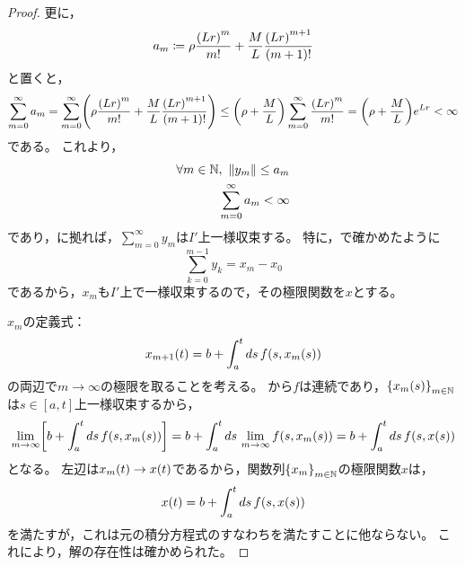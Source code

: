 \documentclass[b5paper,draft,oneside,openany]{ltjsbook} %
\begin{document}
\begin{thm}[Picardの定理]
\begin{proof}
        更に，
        \begin{equation}
            a_m\coloneqq \rho \frac{\pare{Lr}^m}{m!}+\frac{M}{L}\frac{\pare{Lr}^{m+1}}{\pare{m+1}!}
        \end{equation}
        と置くと，
        \begin{equation}
            \sum_{m=0}^\infty a_m
            =\sum_{m=0}^\infty\pare{\rho \frac{\pare{Lr}^m}{m!}+\frac{M}{L}\frac{\pare{Lr}^{m+1}}{\pare{m+1}!}}
            \leq \pare{\rho+\frac{M}{L}}\sum_{m=0}^\infty\frac{\pare{Lr}^m}{m!}
            =\pare{\rho+\frac{M}{L}}e^{Lr}<\infty
        \end{equation}
        である。
        これより，
        \begin{align}
            \forall m\in\N,\ \norm{y_m}\leq a_m
            \\
            \sum_{m=0}^\infty a_m<\infty
        \end{align}
        であり，に拠れば，$\sum_{m=0}^\infty y_m$は$I'$上一様収束する。
        特に，で確かめたように
        \begin{equation}
            \sum_{k=0}^{m-1}y_k=x_m-x_0
        \end{equation}
        であるから，$x_m$も$I'$上で一様収束するので，その極限関数を$x$とする。

        $x_m$の定義式：
        \begin{equation}
            \fun{x_{m+1}}{t}=b+\int_a^t ds\,\fun{f}{s,\fun{x_m}{s}}
        \end{equation}
        の両辺で$m\to\infty$の極限を取ることを考える。
        から$f$は連続であり，$\seq{\fun{x_m}{s}}{m\in\N}$は$s\in[a,t]$上一様収束するから，
        \begin{equation}
            \lim_{m\to\infty}\squ{b + \int_a^t ds\, \fun{f}{s,\fun{x_{m}}{s}}}
            =b + \int_a^t ds\, \lim_{m\to\infty}\fun{f}{s,\fun{x_{m}}{s}}
            =b + \int_a^t ds\, \fun{f}{s,\fun{x}{s}}
        \end{equation}
        となる。
        左辺は$\fun{x_m}{t}\to\fun{x}{t}$であるから，関数列$\seq{x_m}{m\in\N}$の極限関数$x$は，
        \begin{equation}
            \fun{x}{t}=b+\int_a^t ds\,\fun{f}{s,\fun{x}{s}}
        \end{equation}
        を満たすが，これは元の積分方程式のすなわちを満たすことに他ならない。
        これにより，解の存在性は確かめられた。


\end{proof}
\end{thm}
\end{document}
